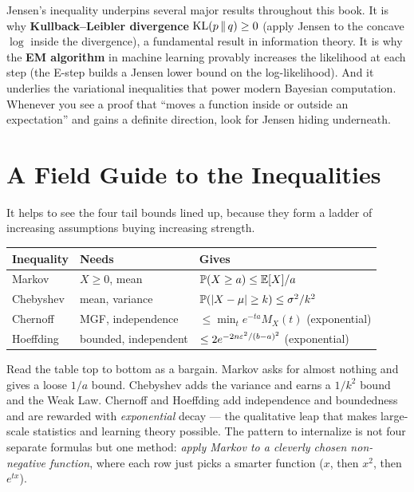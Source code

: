 \begin{connectionbox}
Jensen's inequality underpins several major results throughout this book.
It is why \textbf{Kullback--Leibler divergence} $\operatorname{KL}(p\,\|\,q) \ge 0$ (apply
Jensen to the concave $\log$ inside the divergence), a fundamental result in
information theory. It is why the \textbf{EM algorithm} in machine learning
provably increases the likelihood at each step (the E-step builds a Jensen
lower bound on the log-likelihood). And it underlies the variational
inequalities that power modern Bayesian computation. Whenever you see a proof
that ``moves a function inside or outside an expectation'' and gains a definite
direction, look for Jensen hiding underneath.
\end{connectionbox}

\section{A Field Guide to the Inequalities}
\label{ch19:fieldguide}

It helps to see the four tail bounds lined up, because they form a ladder of
increasing assumptions buying increasing strength.

\begin{center}
\begin{tabular}{@{}lll@{}}
\toprule
\textbf{Inequality} & \textbf{Needs} & \textbf{Gives} \\
\midrule
Markov     & $X\ge 0$, mean & $\operatorname{\mathbb{P}}(X\ge a) \le \operatorname{\mathbb{E}}[X]/a$ \\
Chebyshev  & mean, variance & $\operatorname{\mathbb{P}}(\lvert X-\mu\rvert\ge k)\le \sigma^2/k^2$ \\
Chernoff   & MGF, independence & $\le \min_t e^{-ta}M_X(t)$ (exponential) \\
Hoeffding  & bounded, independent & $\le 2e^{-2n\varepsilon^2/(b-a)^2}$ (exponential) \\
\bottomrule
\end{tabular}
\end{center}

Read the table top to bottom as a bargain. Markov asks for almost nothing and
gives a loose $1/a$ bound. Chebyshev adds the variance and earns a $1/k^2$
bound and the Weak Law. Chernoff and Hoeffding add independence and
boundedness and are rewarded with \emph{exponential} decay --- the qualitative
leap that makes large-scale statistics and learning theory possible. The
pattern to internalize is not four separate formulas but one method:
\emph{apply Markov to a cleverly chosen non-negative function}, where each row
just picks a smarter function ($x$, then $x^2$, then $e^{tx}$).

